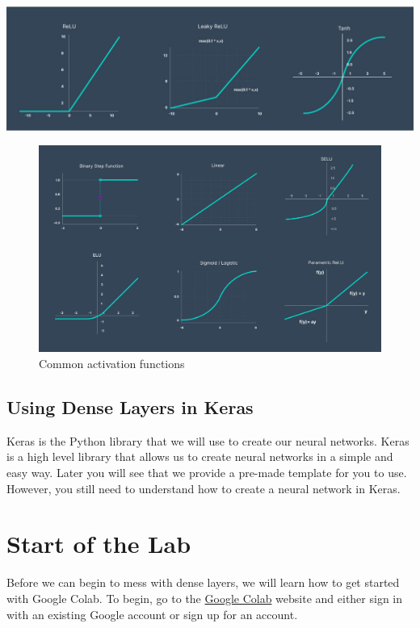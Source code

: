 \documentclass[11pt]{report}
\begin{document}
\includegraphics[width=1\textwidth]{activation functions 1.jpg}
\begin{figure}
    \begin{center}
    \includegraphics[width=1\textwidth]{activation functions 2.jpg}
    \caption{Common activation functions}
    \label{fig:activation_functions}
    \end{center}
\end{figure}

\pagebreak

\section{Using Dense Layers in Keras}
Keras is the Python library that we will use to create our neural networks. Keras is a high level library that allows us to create neural networks in a simple and easy way. Later you will see that we provide a pre-made template for you to use. However, you still need to understand how to create a neural network in Keras.


\chapter{Start of the Lab}
Before we can begin to mess with dense layers, we will learn how to get started with Google Colab. To begin, go to the \href{https://accounts.google.com/v3/signin/identifier?dsh=S1644191332%3A1675546780545376&continue=https%3A%2F%2Fcolab.research.google.com%2F&ec=GAZAqQM&passive=true&flowName=GlifWebSignIn&flowEntry=ServiceLogin&ifkv=AWnogHeZG2rpE0K9cdZU_E4kGDMUnn6If0bNDxEje1kgybK3_oj12LJ91m-WjXqGeI5Ljbego94BOQ}{Google Colab} website and either sign in with an existing Google account or sign up for an account.
\end{document}
